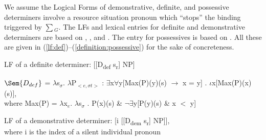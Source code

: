 \documentclass[output=paper,modfonts,nonflat]{langsci/langscibook}
\begin{document}
We assume the Logical Forms of demonstrative, definite, and possessive determiners involve a resource situation pronoun which ``stops'' the binding triggered by $\sum$$_{G}$. The LFs and lexical entries for definite and demonstrative determiners are based on \citet{Heim:2011}, \citet{Elbourne:2008}, and \citet{Schwarz:2009}. The entry for possessives is based on \cite{SimonenkoCarlier:2019}. All these are given in (\ref{lf:def})--(\ref{definition:possessive}) for the sake of concreteness.

\ea\label{lf:def} LF of a definite determiner:
[[D\textsubscript{def} s\textsubscript{r}] NP]\\
\z

\ea
$\Sem{D_{def}}$ =  $\lambda$s$_{\sigma}$. $\lambda$P$_{<e,\sigma t>}$ : $\exists$x$\forall$y[Max(P)(y)(s) $\rightarrow$ x = y] . $\iota$x[Max(P)(x)(s)],\\
where Max(P) = $\lambda$x$_{e}$. $\lambda$s$_{\sigma}$ . P(x)(s) \& $\neg\exists$y[P(y)(s) \& x $<$ y] \label{definition:definite} 
\z



\ea LF of a demonstrative determiner:
[i [[D\textsubscript{dem} s\textsubscript{r}] NP]],\\
where i is the index of a silent individual pronoun
\z
\end{document}
